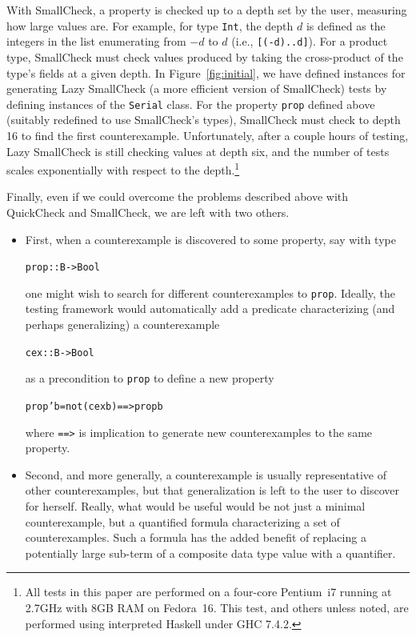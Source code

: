 \documentclass[10pt]{sigplanconf}
\newenvironment{code}{\begin{alltt}}{\end{alltt}}
\newcommand{\ttp}[1]{\texttt{#1}}
\begin{document}
With SmallCheck, a property is checked up to a depth set by the user, measuring
how large values are.  For example, for type \ttp{Int}, the depth $d$ is defined
as the integers in the list enumerating from $-d$ to $d$ (i.e.,
\ttp{[(-d)..d]}).  For a product type, SmallCheck must check values produced by
taking the cross-product of the type's fields at a given depth.  In
Figure~\ref{fig:initial}, we have defined instances for generating Lazy
SmallCheck (a more efficient version of SmallCheck) tests by defining instances
of the \ttp{Serial} class.  For the property \ttp{prop} defined above (suitably
redefined to use SmallCheck's types), SmallCheck must check to depth 16 to find
the first counterexample.  Unfortunately, after a couple hours of testing, Lazy
SmallCheck is still checking values at depth six, and the number of tests scales
exponentially with respect to the depth.\footnote{All tests in this paper are
  performed on a four-core Pentium~i7 running at 2.7GHz with 8GB RAM on
  Fedora~16.  This test, and others unless noted, are performed using
  interpreted Haskell under GHC 7.4.2.}

Finally, even if we could overcome the problems described above with QuickCheck
and SmallCheck, we are left with two others.
\begin{itemize}
  \item First, when a counterexample is discovered to some property, say with
    type
%
\begin{code}
prop :: B -> Bool
\end{code}
%
\noindent
one might wish to search for different counterexamples to \ttp{prop}.  Ideally,
the testing framework would automatically add a predicate characterizing (and
perhaps generalizing) a counterexample
%
\begin{code}
cex :: B -> Bool
\end{code}
%
\noindent
as a precondition to \ttp{prop} to define a new property
\begin{code}
prop' b = not (cex b) ==> prop b
\end{code}
%
\noindent
where \ttp{==>} is implication to generate new counterexamples to the same property.

  \item Second, and more generally, a counterexample is usually representative
    of other counterexamples, but that generalization is left to the user to
    discover for herself.  Really, what would be useful would be not just a
    minimal counterexample, but a quantified formula characterizing a set of
    counterexamples.  Such a formula has the added benefit of replacing a
    potentially large sub-term of a composite data type value with a quantifier.
\end{itemize}
\end{document}
